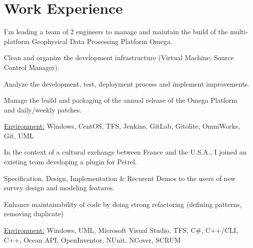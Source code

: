 \documentclass[10pt,letterpaper]{resume/resume}
\begin{document}
  \begin{minipage}[t]{\linewidth}
    \section{Work Experience}


\par I'm leading a team of 2 engineers to manage and maintain the build of the multi-platform Geophysical Data Processing Platform Omega. 
\par Clean and organize the development infrastructure (Virtual Machine, Source Control Manager). 
\par Analyze the development, test, deployment process and implement improvements.
\par Manage the build and packaging of the annual release of the Omega Platform and daily/weekly patches.
\par\underline{Environment:} Windows, CentOS, TFS, Jenkins, GitLab, Gitolite, OmniWorks, Git, UML
%
%

\par In the context of a cultural exchange between France and the U.S.A., I joined an existing team developing a plugin for Petrel.
\par Specification, Design, Implementation \& Recurent Demos to the users of new survey design and modeling features.
\par Enhance maintainability of code by doing strong refactoring (defining patterns, removing duplicate)
\par\underline{Environment:} Windows, UML, Microsoft Visual Studio, TFS, C\#, C++/CLI, C++, Ocean API, OpenInventor, NUnit, NCover, SCRUM


\end{minipage}
\end{document}
